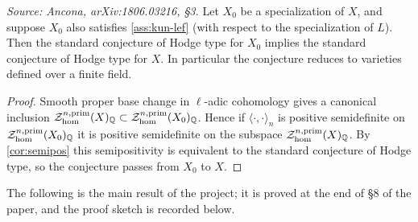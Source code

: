 \begin{proposition}
  \label{prop:reduce-finite}
  \textit{Source: Ancona, arXiv:1806.03216, §3.}
  Let \(X_0\) be a specialization of \(X\), and suppose \(X_0\) also satisfies
  \cref{ass:kun-lef} (with respect to the specialization of \(L\)). Then the
  standard conjecture of Hodge type for \(X_0\) implies the standard conjecture of
  Hodge type for \(X\). In particular the conjecture reduces to varieties defined
  over a finite field.
\end{proposition}

\begin{proof}
  Smooth proper base change in \(\ell\)-adic cohomology gives a canonical
  inclusion
  \(\mathcal{Z}_{\hom}^{n,\mathrm{prim}}(X)_{\mathbb{Q}} \subset
  \mathcal{Z}_{\hom}^{n,\mathrm{prim}}(X_0)_{\mathbb{Q}}\). Hence if
  \(\langle \cdot, \cdot \rangle_{n}\) is positive semidefinite on
  \(\mathcal{Z}_{\hom}^{n,\mathrm{prim}}(X_0)_{\mathbb{Q}}\) it is positive semidefinite on the
  subspace \(\mathcal{Z}_{\hom}^{n,\mathrm{prim}}(X)_{\mathbb{Q}}\). By \cref{cor:semipos} this
  semipositivity is equivalent to the standard conjecture of Hodge type, so the
  conjecture passes from \(X_0\) to \(X\).
\end{proof}

The following is the main result of the project; it is proved at the end of \S8
of the paper, and the proof sketch is recorded below.

